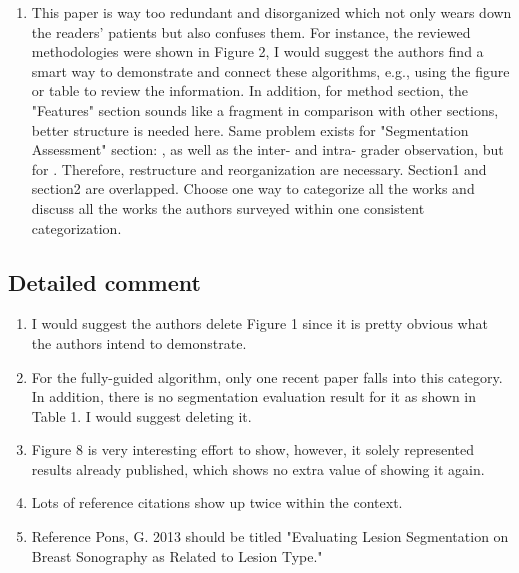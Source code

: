 \documentclass[]{tufte-handout}
\begin{document}
\begin{enumerate}
\item This paper is way too redundant and disorganized which not only wears down the readers' patients but also confuses them. For instance, the reviewed methodologies were shown in Figure 2,  I would suggest the authors find a smart way to demonstrate and connect these algorithms, e.g., using the figure or table to review the information. In addition, for method section, the "Features" section sounds like a fragment in comparison with other sections, better structure is needed here. Same problem exists for "Segmentation Assessment" section: , as well as the inter- and intra- grader observation, but for .  Therefore, restructure and reorganization are necessary. Section1 and section2 are overlapped. Choose one way to categorize all
the works and discuss all the works the authors surveyed within one consistent categorization.
\end{enumerate}

\subsection{Detailed comment}
\begin{enumerate}
\item I would suggest the authors delete Figure 1 since it is pretty obvious what the authors intend to demonstrate.
\item For the fully-guided algorithm, only one recent paper falls into this category. In addition, there is no segmentation evaluation result for it as shown in Table 1. I would suggest deleting it.
\item Figure 8 is very interesting effort to show, however, it solely represented results already published, which shows no extra value of showing it again.
\item Lots of reference citations show up twice within the context.
\item Reference Pons, G. 2013 should be titled "Evaluating Lesion Segmentation on Breast Sonography as Related to Lesion Type."
\end{enumerate}
\end{document}
